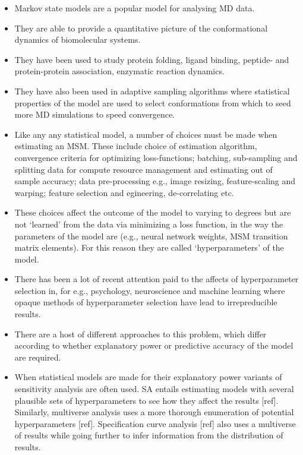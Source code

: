 \documentclass[journal=jacsat,manuscript=article]{achemso}
\begin{document}
\begin{itemize}
    \item Markov state models are a popular model for analysing MD data. 
    \item They are able to provide a quantitative picture of the conformational dynamics of biomolecular systems. 
    \item They have been used to study protein folding, ligand binding, peptide- and protein-protein association,  enzymatic reaction dynamics. 
    \item They have also been used in adaptive sampling algorithms where statistical properties of the model are used to select conformations from which to seed more MD simulations to speed convergence. 
    \item Like any any statistical model, a number of choices must be made when estimating an MSM. These include choice of estimation algorithm, convergence criteria for optimizing loss-functions; batching, sub-sampling and splitting data for compute resource management and estimating out of sample accuracy; data pre-processing e.g., image resizing, feature-scaling and warping; feature selection and egineering, de-correlating etc. 
    \item These choices affect the outcome of the model to varying to degrees but are not `learned' from the data via minimizing a loss function, in the way the parameters of the model are (e.g., neural network weights, MSM transition matrix elements). For this reason they are called `hyperparameters' of the model. 
    \item There has been a lot of recent attention paid to the affects of hyperparameter selection in, for e.g.,  psychology, neuroscience and machine learning  where opaque methods of hyperparameter selection have lead to irrepreducible results. 
    \item There are a host of different approaches to this problem, which differ according to whether explanatory power or predictive accuracy of the model are required. 
    \item When statistical models are made for their explanatory power variants of sensitivity analysis are often used. SA entails estimating models with  several plausible sets of hyperparameters to see how they affect the results [ref].  Similarly, multiverse analysis uses a more thorough enumeration of potential hyperparameters [ref].  Specification curve analysis [ref] also uses a multiverse of results while going further to infer information from the distribution of results. 

\end{itemize}
\end{document}

